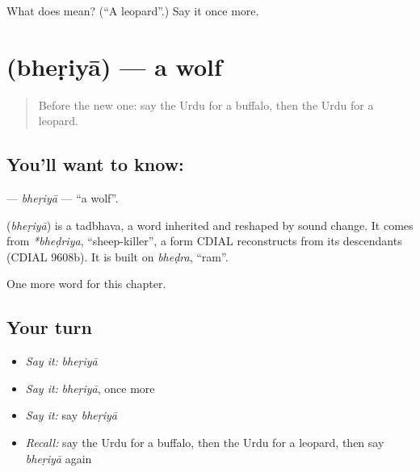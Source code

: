 \begin{tcolorbox}[breakable,colback=teal!4,colframe=teal!35!black,title={Before you move on}]
What does  mean? (\textquotedblleft{}A leopard\textquotedblright{}.) Say it once more.
\end{tcolorbox}
\section[\texorpdfstring{\ur{بھیڑیا} (bheṛiyā)}{بھیڑیا (bheṛiyā)}]{ (bheṛiyā) — a wolf}

\label{lesson:UR-C227-bheriya}



\begin{quote}
Before the new one: say the Urdu for a buffalo, then the Urdu for a leopard.
\end{quote}

\subsection*{You'll want to know: }
\textbf{} — \emph{bheṛiyā} — \textquotedblleft{}a wolf\textquotedblright{}.

\begin{cousinweb}
\textbf{} (\emph{bheṛiyā}) is a tadbhava, a word inherited and reshaped by sound change. It comes from \emph{*bheḍriya}, \textquotedblleft{}sheep-killer\textquotedblright{}, a form CDIAL reconstructs from its descendants (CDIAL 9608b). It is built on \emph{bheḍra}, \textquotedblleft{}ram\textquotedblright{}.
\end{cousinweb}

\begin{grammarlens}[title={What you've built}]
One more word for this chapter.
\end{grammarlens}

\subsection*{Your turn}
\begin{itemize}
\raggedright
  \item \emph{Say it:} \emph{bheṛiyā}
  \item \emph{Say it:} \emph{bheṛiyā}, once more
  \item \emph{Say it:} say \emph{bheṛiyā}
  \item \emph{Recall:} say the Urdu for a buffalo, then the Urdu for a leopard, then say \emph{bheṛiyā} again
\end{itemize}

